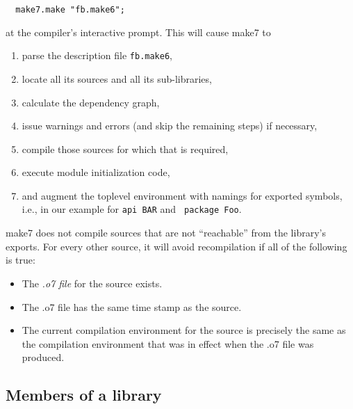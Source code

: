 \begin{verbatim}
  make7.make "fb.make6";
\end{verbatim}

at the compiler's interactive prompt.  This will cause make7 to

\begin{enumerate}
\item parse the description file {\tt fb.make6},
\item locate all its sources and all its sub-libraries,
\item calculate the dependency graph,
\item issue warnings and errors (and skip the remaining steps) if
necessary,
\item compile those sources for which that is required,
\item execute module initialization code,
\item and augment the toplevel environment with namings for exported
symbols, i.e., in our example for {\tt api BAR} and {\tt
package Foo}.
\end{enumerate}

make7 does not compile sources that are not ``reachable'' from the
library's exports.  For every other source, it will avoid
recompilation if all of the following is true:

\begin{itemize}
\item The {\em .o7 file} for the source exists.
\item The .o7 file has the same time stamp as the source.
\item The current compilation environment for the source is precisely
the same as the compilation environment that was in effect when the
.o7 file was produced.
\end{itemize}

\subsection{Members of a library}

